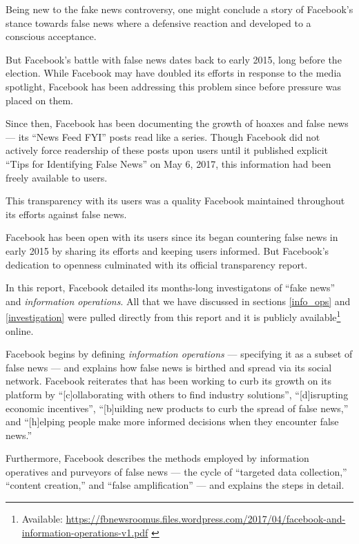 
\par Being new to the fake news controversy, one might conclude a story of Facebook's stance towards false news where a defensive reaction and developed to a conscious acceptance.
\par But Facebook's battle with false news dates back to early 2015, long before the election. \cite{fb_hoaxes_2015} While Facebook may have doubled its efforts in response to the media spotlight, Facebook has been addressing this problem since before pressure was placed on them.
\par Since then, Facebook has been documenting the growth of hoaxes and false news --- its ``News Feed FYI'' posts read like a series. \cite{fb_hoaxes_2015,fb_hoaxes_2016} Though Facebook did not actively force readership of these posts upon users until it published explicit ``Tips for Identifying False News'' on May 6, 2017, \cite{guardian_tips} this information had been freely available to users.
\par This transparency with its users was a quality Facebook maintained throughout its efforts against false news.



\par Facebook has been open with its users since its began countering false news in early 2015 by sharing its efforts \cite{zuck_resp_b} and keeping users informed. \cite{fb_hoaxes_2015,fb_hoaxes_2016} But Facebook's dedication to openness culminated with its official transparency report. \cite{fb_info_ops} 
\par In this report, Facebook detailed its months-long investigatons of ``fake news'' and \emph{information operations}. \cite{fb_info_ops} All that we have discussed in sections \ref{info_ops} and \ref{investigation} were pulled directly from this report and it is publicly available\footnote{Available: \url{https://fbnewsroomus.files.wordpress.com/2017/04/facebook-and-information-operations-v1.pdf} \cite{fb_info_ops}} online.


\par Facebook begins by defining \emph{information operations} --- specifying it as a subset of false news --- and explains how false news is birthed and spread via its social network. Facebook reiterates that has been working to curb its growth on its platform by ``[c]ollaborating with others to find industry solutions'', ``[d]isrupting economic incentives'', ``[b]uilding new products to curb the spread of false news,'' and ``[h]elping people make more informed decisions when they encounter false news.'' \cite{fb_info_ops}
\par Furthermore, Facebook describes the methods employed by information operatives and purveyors of false news --- the cycle of ``targeted data collection,'' ``content creation,'' and ``false amplification'' --- and explains the steps in detail. \cite{fb_info_ops}

